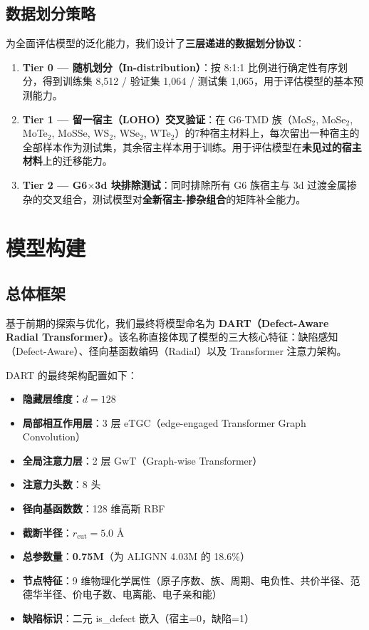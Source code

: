 \subsection{数据划分策略}

为全面评估模型的泛化能力，我们设计了\textbf{三层递进的数据划分协议}：

\begin{enumerate}
    \item \textbf{Tier 0 — 随机划分（In-distribution）}：按 8:1:1 比例进行确定性有序划分，得到训练集 8,512 / 验证集 1,064 / 测试集 1,065，用于评估模型的基本预测能力。

    \item \textbf{Tier 1 — 留一宿主（LOHO）交叉验证}：在 G6-TMD 族（MoS$_2$, MoSe$_2$, MoTe$_2$, MoSSe, WS$_2$, WSe$_2$, WTe$_2$）的7种宿主材料上，每次留出一种宿主的全部样本作为测试集，其余宿主样本用于训练。用于评估模型在\textbf{未见过的宿主材料}上的迁移能力。

    \item \textbf{Tier 2 — G6$\times$3d 块排除测试}：同时排除所有 G6 族宿主与 3d 过渡金属掺杂的交叉组合，测试模型对\textbf{全新宿主-掺杂组合}的矩阵补全能力。
\end{enumerate}


\section{模型构建}

\subsection{总体框架}

基于前期的探索与优化，我们最终将模型命名为 \textbf{DART（Defect-Aware Radial Transformer）}。该名称直接体现了模型的三大核心特征：缺陷感知（Defect-Aware）、径向基函数编码（Radial）以及 Transformer 注意力架构。

DART 的最终架构配置如下：
\begin{itemize}
    \item \textbf{隐藏层维度}：$d = 128$
    \item \textbf{局部相互作用层}：3 层 eTGC（edge-engaged Transformer Graph Convolution）
    \item \textbf{全局注意力层}：2 层 GwT（Graph-wise Transformer）
    \item \textbf{注意力头数}：8 头
    \item \textbf{径向基函数数}：128 维高斯 RBF
    \item \textbf{截断半径}：$r_{\mathrm{cut}} = 5.0$ \AA
    \item \textbf{总参数量}：\textbf{0.75M}（为 ALIGNN 4.03M 的 18.6\%）
    \item \textbf{节点特征}：9 维物理化学属性（原子序数、族、周期、电负性、共价半径、范德华半径、价电子数、电离能、电子亲和能）
    \item \textbf{缺陷标识}：二元 is\_defect 嵌入（宿主=0，缺陷=1）
\end{itemize}

